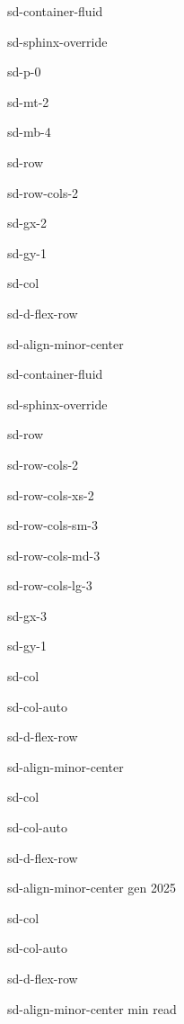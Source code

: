 \documentclass[letterpaper,10pt,italian]{jupyterBook}
\begin{document}
\begin{sphinxuseclass}{sd-container-fluid}
\begin{sphinxuseclass}{sd-sphinx-override}
\begin{sphinxuseclass}{sd-p-0}
\begin{sphinxuseclass}{sd-mt-2}
\begin{sphinxuseclass}{sd-mb-4}
\begin{sphinxuseclass}{sd-row}
\begin{sphinxuseclass}{sd-row-cols-2}
\begin{sphinxuseclass}{sd-gx-2}
\begin{sphinxuseclass}{sd-gy-1}
\begin{sphinxuseclass}{sd-col}
\begin{sphinxuseclass}{sd-d-flex-row}
\begin{sphinxuseclass}{sd-align-minor-center}
\begin{sphinxuseclass}{sd-container-fluid}
\begin{sphinxuseclass}{sd-sphinx-override}
\begin{sphinxuseclass}{sd-row}
\begin{sphinxuseclass}{sd-row-cols-2}
\begin{sphinxuseclass}{sd-row-cols-xs-2}
\begin{sphinxuseclass}{sd-row-cols-sm-3}
\begin{sphinxuseclass}{sd-row-cols-md-3}
\begin{sphinxuseclass}{sd-row-cols-lg-3}
\begin{sphinxuseclass}{sd-gx-3}
\begin{sphinxuseclass}{sd-gy-1}
\begin{sphinxuseclass}{sd-col}
\begin{sphinxuseclass}{sd-col-auto}
\begin{sphinxuseclass}{sd-d-flex-row}
\begin{sphinxuseclass}{sd-align-minor-center}
\end{sphinxuseclass}
\end{sphinxuseclass}
\end{sphinxuseclass}
\end{sphinxuseclass}
\begin{sphinxuseclass}{sd-col}
\begin{sphinxuseclass}{sd-col-auto}
\begin{sphinxuseclass}{sd-d-flex-row}
\begin{sphinxuseclass}{sd-align-minor-center}
 gen 2025

\end{sphinxuseclass}
\end{sphinxuseclass}
\end{sphinxuseclass}
\end{sphinxuseclass}
\begin{sphinxuseclass}{sd-col}
\begin{sphinxuseclass}{sd-col-auto}
\begin{sphinxuseclass}{sd-d-flex-row}
\begin{sphinxuseclass}{sd-align-minor-center}
 min read


\end{sphinxuseclass}
\end{sphinxuseclass}
\end{sphinxuseclass}
\end{sphinxuseclass}
\end{sphinxuseclass}
\end{sphinxuseclass}
\end{sphinxuseclass}
\end{sphinxuseclass}
\end{sphinxuseclass}
\end{sphinxuseclass}
\end{sphinxuseclass}
\end{sphinxuseclass}
\end{sphinxuseclass}
\end{sphinxuseclass}
\end{sphinxuseclass}
\end{sphinxuseclass}
\end{sphinxuseclass}
\end{sphinxuseclass}
\end{sphinxuseclass}
\end{sphinxuseclass}
\end{sphinxuseclass}
\end{sphinxuseclass}
\end{sphinxuseclass}
\end{sphinxuseclass}
\end{sphinxuseclass}
\end{sphinxuseclass}
\end{document}
